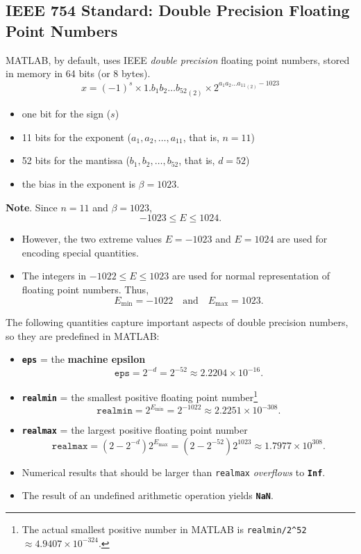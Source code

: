 \documentclass[]{ximera}
\begin{document}
\subsection{IEEE 754 Standard: Double Precision Floating Point Numbers}
\label{sec:org72596b8}
MATLAB, by default, uses IEEE \emph{double precision} floating point numbers, stored in memory in 64 bits (or 8 bytes).
\begin{equation*}
  x = (-1)^s \times 1.b_1 b_2 \ldots {b_{52}}_{(2)} \times 2^{a_1 a_2 \ldots {a_{11}}_{(2)} - 1023}
\end{equation*}

\begin{itemize}
\item one bit for the sign ($s$)
\item 11 bits for the exponent ($a_1, a_2, \ldots, a_{11}$, that is, $n = 11$)
\item 52 bits for the mantissa ($b_1, b_2, \ldots, b_{52}$, that is, $d = 52$)
\item the bias in the exponent is $\beta = 1023$.
\end{itemize}

\textbf{Note}. Since $n=11$ and $\beta = 1023$,
\[
-1023 \le E \le 1024.
\]

\begin{itemize}
\item However, the two extreme values $E = -1023$ and $E = 1024$ are used for encoding special quantities.
\item The integers in $-1022 \le E \le 1023$ are used for normal representation of floating point numbers. Thus,
\[
   E_{\text{min}} = -1022
   \quad\text{and}\quad
   E_{\text{max}} = 1023.
   \]
\end{itemize}

The following quantities capture important aspects of double precision numbers, so they are predefined in MATLAB:

\begin{itemize}
\item \textbf{\texttt{eps}} = the \textbf{machine epsilon}
\[
     \mathtt{eps} = 2^{-d}  = 2^{-52} \approx 2.2204 \times 10^{-16}.
   \]
\item \textbf{\texttt{realmin}} = the smallest positive floating point number\footnote{The actual smallest positive number in MATLAB is \texttt{realmin/2\textasciicircum{}52} $\approx 4.9407 \times 10^{-324}$.}
\[
     \mathtt{realmin} = 2^{E_\text{min}} = 2^{-1022} \approx 2.2251 \times 10^{-308}.
   \]
\item \textbf{\texttt{realmax}} = the largest positive floating point number
\[
     \mathtt{realmax} = (2-2^{-d})2^{E_\text{max}} = (2-2^{-52}) 2^{1023} \approx 1.7977 \times 10^{308}.
   \]
\item Numerical results that should be larger than \texttt{realmax} \emph{overflows} to \textbf{\texttt{Inf}}.
\item The result of an undefined arithmetic operation yields \textbf{\texttt{NaN}}.
\end{itemize}
\end{document}
